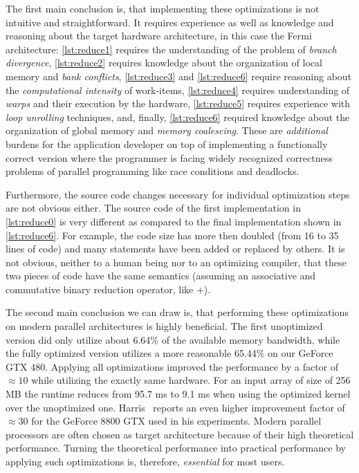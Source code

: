 The first main conclusion is, that implementing these optimizations is not intuitive and straightforward.
It requires experience as well as knowledge and reasoning about the target hardware architecture, in this case the Fermi \GPU architecture:
\autoref{lst:reduce1} requires the understanding of the problem of \emph{branch divergence}, \autoref{lst:reduce2} requires knowledge about the organization of local memory and \emph{bank conflicts}, \autoref{lst:reduce3} and \autoref{lst:reduce6} require reasoning about the \emph{computational intensity} of work-items, \autoref{lst:reduce4} requires understanding of \emph{warps} and their execution by the hardware, \autoref{lst:reduce5} requires experience with \emph{loop unrolling} techniques, and, finally, \autoref{lst:reduce6} required knowledge about the organization of global memory and \emph{memory coalescing}.
These are \emph{additional} burdens for the application developer on top of implementing a functionally correct version where the programmer is facing widely recognized correctness problems of parallel programming like race conditions and deadlocks.

Furthermore, the source code changes necessary for individual optimization steps are not obvious either.
The source code of the first implementation in \autoref{lst:reduce0} is very different as compared to the final implementation shown in \autoref{lst:reduce6}.
For example, the code size has more then doubled (from 16 to 35 lines of code) and many statements have been added or replaced by others.
It is not obvious, neither to a human being nor to an optimizing compiler, that these two pieces of code have the same semantics (assuming an associative and commutative binary reduction operator, like $+$).

The second main conclusion we can draw is, that performing these optimizations on modern parallel architectures is highly beneficial.
The first unoptimized version did only utilize about 6.64\% of the available memory bandwidth, while the fully optimized version utilizes a more reasonable 65.44\% on our GeForce GTX 480.
Applying all optimizations improved the performance by a factor of $\approx${}$10$ while utilizing the exactly same hardware.
For an input array of size of 256 MB the runtime reduces from 95.7 ms to 9.1 ms when using the optimized kernel over the unoptimized one.
Harris~\cite{Harris2007} reports an even higher improvement factor of $\approx${}$30$ for the GeForce 8800 GTX used in his experiments.
Modern parallel processors are often chosen as target architecture because of their high theoretical performance.
Turning the theoretical performance into practical performance by applying such optimizations is, therefore, \emph{essential} for most users.





